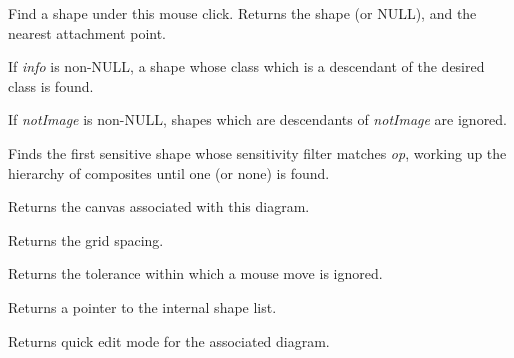 

Find a shape under this mouse click. Returns the shape (or NULL), and the nearest attachment point.

If {\it info} is non-NULL, a shape whose class which is a descendant of the desired class is found.

If {\it notImage} is non-NULL, shapes which are descendants of {\it notImage} are ignored.



Finds the first sensitive shape whose sensitivity filter matches {\it op}, working up the hierarchy of composites until
one (or none) is found.



Returns the canvas associated with this diagram.



Returns the grid spacing.



Returns the tolerance within which a mouse move is ignored.



Returns a pointer to the internal shape list.



Returns quick edit mode for the associated diagram.



